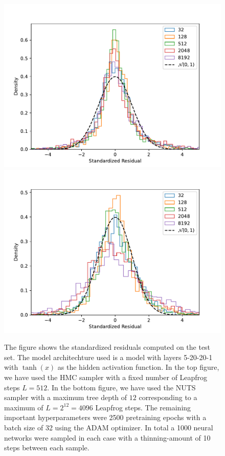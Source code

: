 \begin{figure}[h!]
    \centering
    \includegraphics[scale=0.7]{figures/standardized_residuals/effect_of_burnin/standardized_residuals_hmc_vs_burn_in_steps.pdf}
    \includegraphics[scale=0.7]{figures/standardized_residuals/effect_of_burnin/standardized_residuals_nuts_vs_burn_in_steps.pdf}
    \caption{The figure shows the standardized residuals computed on the test set. The model architechture used is a model with layers 5-20-20-1 with $\tanh(x)$ as the hidden activation function. In the top figure, we have used the HMC sampler with a fixed number of Leapfrog steps $L = 512$. In the bottom figure, we have used the NUTS sampler with a maximum tree depth of $12$ corresponding to a maximum of $L = 2^{12} = 4096$ Leapfrog steps. The remaining important hyperparameters were 2500 pretraining epochs with a batch size of 32 using the ADAM optimizer. In total a 1000 neural networks were sampled in each case with a thinning-amount of 10 steps between each sample.
    }
    \label{fig:standardized_residuals_vs_burn_in_steps}
\end{figure}


